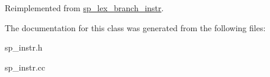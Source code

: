 Reimplemented from \mbox{\hyperlink{classsp__lex__branch__instr_ae3ef8f864474467824615e33f0663d76}{sp\+\_\+lex\+\_\+branch\+\_\+instr}}.



The documentation for this class was generated from the following files\+:\begin{DoxyCompactItemize}
\item 
sp\+\_\+instr.\+h\item 
sp\+\_\+instr.\+cc\end{DoxyCompactItemize}

